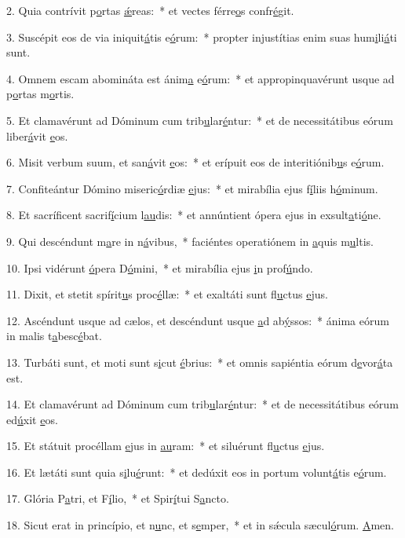 2. Quia contrívit p\uline{o}rtas \uline{ǽ}reas:~* et vectes férre\uline{o}s confr\uline{é}git.\par 
3. Suscépit eos de via iniquit\uline{á}tis e\uline{ó}rum:~* propter injustítias enim suas hum\uline{i}li\uline{á}ti sunt.\par 
4. Omnem escam abomináta est ánim\uline{a} e\uline{ó}rum:~* et appropinquavérunt usque ad p\uline{o}rtas m\uline{o}rtis.\par 
5. Et clamavérunt ad Dóminum cum trib\uline{u}lar\uline{é}ntur:~* et de necessitátibus eórum liber\uline{á}vit \uline{e}os.\par 
6. Misit verbum suum, et san\uline{á}vit \uline{e}os:~* et erípuit eos de interitiónib\uline{u}s e\uline{ó}rum.\par 
7. Confiteántur Dómino miseric\uline{ó}rdiæ \uline{e}jus:~* et mirabília ejus f\uline{í}liis h\uline{ó}minum.\par 
8. Et sacríficent sacrif\uline{í}cium l\uline{au}dis:~* et annúntient ópera ejus in exsult\uline{a}ti\uline{ó}ne.\par 
9. Qui descéndunt m\uline{a}re in n\uline{á}vibus,~* faciéntes operatiónem in \uline{a}quis m\uline{u}ltis.\par 
10. Ipsi vidérunt \uline{ó}pera D\uline{ó}mini,~* et mirabília ejus \uline{i}n prof\uline{ú}ndo.\par 
11. Dixit, et stetit spírit\uline{u}s proc\uline{é}llæ:~* et exaltáti sunt fl\uline{u}ctus \uline{e}jus.\par 
12. Ascéndunt usque ad cælos, et descéndunt usque \uline{a}d ab\uline{ý}ssos:~* ánima eórum in malis t\uline{a}besc\uline{é}bat.\par 
13. Turbáti sunt, et moti sunt s\uline{i}cut \uline{é}brius:~* et omnis sapiéntia eórum d\uline{e}vor\uline{á}ta est.\par 
14. Et clamavérunt ad Dóminum cum trib\uline{u}lar\uline{é}ntur:~* et de necessitátibus eórum ed\uline{ú}xit \uline{e}os.\par 
15. Et státuit procéllam \uline{e}jus in \uline{au}ram:~* et siluérunt fl\uline{u}ctus \uline{e}jus.\par 
16. Et lætáti sunt quia s\uline{i}lu\uline{é}runt:~* et dedúxit eos in portum volunt\uline{á}tis e\uline{ó}rum.\par 
17. Glória P\uline{a}tri, et F\uline{í}lio,~* et Spir\uline{í}tui S\uline{a}ncto.\par 
18. Sicut erat in princípio, et n\uline{u}nc, et s\uline{e}mper,~* et in sǽcula sæcul\uline{ó}rum. \uline{A}men.\par 
